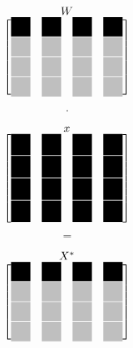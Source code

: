\begin{center}
 
\begin{minipage}{0.2\textwidth}
 \begingroup
 \renewcommand*{\arraystretch}{1.1} %
 \renewcommand*{\arraycolsep}{0.0pt} %

 \[
  \stackrel{\mbox{$W$}}{
   \begin{bmatrix}
    \myBlackBox 	& \myBlackBox 		& \myBlackBox 		& \myBlackBox \\
    \myLightgrayBox 	& \myLightgrayBox 	& \myLightgrayBox 	& \myLightgrayBox \\
    \myLightgrayBox 	& \myLightgrayBox	& \myLightgrayBox	& \myLightgrayBox \\
    \myLightgrayBox 	& \myLightgrayBox 	& \myLightgrayBox 	& \myLightgrayBox 
   \end{bmatrix}
  }
 \]
 \endgroup
\end{minipage}
\begin{minipage}{0.05\textwidth}
 \[
  \cdot
 \]
\end{minipage}
\begin{minipage}{0.2\textwidth}
 \begingroup
 \renewcommand*{\arraystretch}{0.0} %
 \renewcommand*{\arraycolsep}{0.8pt} %

 \[
  \stackrel{\mbox{$x$}}{
   \begin{bmatrix}
    \myBlackBoxHigh 	& \myBlackBoxHigh 	& \myBlackBoxHigh 	& \myBlackBoxHigh \\
    \myBlackBoxHigh 	& \myBlackBoxHigh 	& \myBlackBoxHigh 	& \myBlackBoxHigh \\
    \myBlackBoxHigh 	& \myBlackBoxHigh 	& \myBlackBoxHigh 	& \myBlackBoxHigh \\
    \myBlackBoxHigh 	& \myBlackBoxHigh 	& \myBlackBoxHigh 	& \myBlackBoxHigh 
   \end{bmatrix}
  }
 \]
 \endgroup
\end{minipage}
\begin{minipage}{0.05\textwidth}
 \[
  =
 \]
\end{minipage}
\begin{minipage}{0.3\textwidth}
\begingroup
\renewcommand*{\arraystretch}{1.1} %
\renewcommand*{\arraycolsep}{0.8pt} %
\begin{align}\label{eq:matrix_F1}
  \stackrel{\mbox{$X^*$}}{
   \begin{bmatrix}
    \myBlackBox 	& \myBlackBox 		& \myBlackBox 		& \myBlackBox \\
    \myLightgrayBox 	& \myLightgrayBox 	& \myLightgrayBox 	& \myLightgrayBox \\
    \myLightgrayBox 	& \myLightgrayBox 	& \myLightgrayBox 	& \myLightgrayBox \\
    \myLightgrayBox 	& \myLightgrayBox 	& \myLightgrayBox 	& \myLightgrayBox 
   \end{bmatrix}
  }
\end{align}

 
 \endgroup
\end{minipage}
\end{center}


